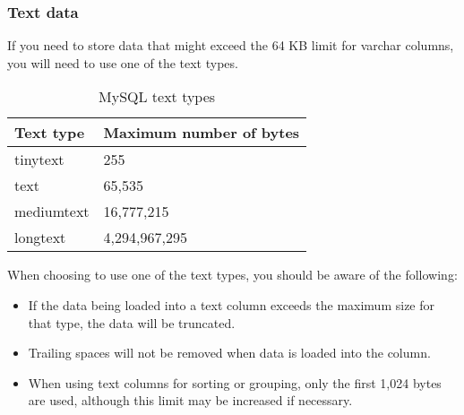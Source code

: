 \subsubsection*{Text data}
If you need to store data that might exceed the 64 KB limit for varchar columns, you will need to use one of the text types.
\begin{table}
    \centering
    \caption{MySQL text types}
    \label{tbl2-1}
    \begin{tabular}{ll}
        \hline
        Text type  & Maximum number of bytes \\
        \hline
        tinytext   & 255                     \\
        text       & 65,535                  \\
        mediumtext & 16,777,215              \\
        longtext   & 4,294,967,295           \\
        \hline
    \end{tabular}
\end{table}

When choosing to use one of the text types, you should be aware of the following:
\begin{itemize}
    \item If the data being loaded into a text column exceeds the maximum size for that type, the data will be truncated.
    \item Trailing spaces will not be removed when data is loaded into the column.
    \item When using text columns for sorting or grouping, only the first 1,024 bytes are used, although this limit may be increased if necessary.
\end{itemize}